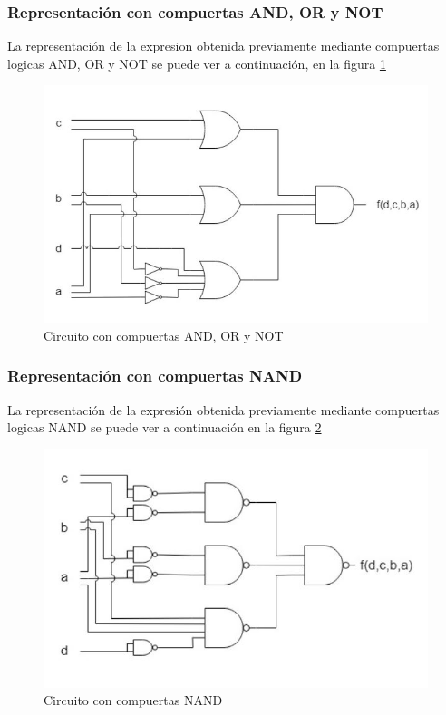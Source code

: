 \subsubsection{Representaci\'on con compuertas AND, OR y NOT}
\noindent
La representaci\'on de la expresion obtenida previamente mediante compuertas logicas AND, OR y NOT se puede ver a continuaci\'on, en la figura \ref{fig:ej2b}

\begin{figure}[H]
    \centering
    \includegraphics[scale=0.55]{images/ej2/circuito1_ej2_parteb.JPG}
    \caption{Circuito con compuertas AND, OR y NOT}
    \label{fig:ej2b}
\end{figure}

\subsubsection{Representaci\'on con compuertas NAND}
\noindent
La representaci\'on de la expresi\'on obtenida previamente mediante compuertas logicas NAND se puede ver a continuaci\'on en la figura \ref{fig:ej2bnand}

\begin{figure}[H]
    \centering
    \includegraphics[scale=0.7]{images/ej2/circuito2_ej2_parteb.JPG}
    \caption{Circuito con compuertas NAND}
    \label{fig:ej2bnand}
\end{figure}\\